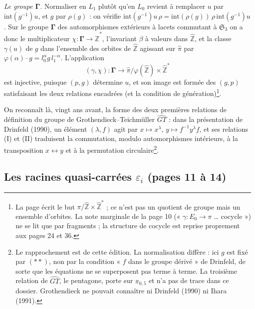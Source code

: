 \documentclass[11pt,a4paper]{article}
\begin{document}
\emph{Le groupe $\boldsymbol{\Gamma}$.} Normaliser en $L_1$ plutôt qu'en $L_0$
revient à remplacer $u$ par $\mathrm{int}(g^{-1})u$, et $g$ par $\rho(g)$ :
on vérifie $\mathrm{int}(g^{-1})u\,\rho = \mathrm{int}(\rho(g))\,\rho\,
\mathrm{int}(g^{-1})u$. Sur le groupe $\boldsymbol{\Gamma}$ des automorphismes
extérieurs à lacets commutant à $\mathfrak{S}_3$ on a donc le multiplicateur
$\chi : \boldsymbol{\Gamma} \to \widehat{\mathbb{Z}}^{*}$, l'invariant $\beta$ à
valeurs dans $\widehat{\mathbb{Z}}$, et la classe $\gamma(u)$ de $g$ dans
l'ensemble des orbites de $\widehat{\mathbb{Z}}$ agissant sur $\widehat{\pi}$
par $\varphi(\alpha)\cdot g = l_0^{\alpha} g\, l_1^{-\alpha}$. L'application
\[
(\gamma, \chi) : \boldsymbol{\Gamma} \longrightarrow
\widehat{\pi}/\varphi(\widehat{\mathbb{Z}}) \times \widehat{\mathbb{Z}}^{*}
\]
est injective, puisque $(p, g)$ détermine $u$, et son image est formée des
$(g, p)$ satisfaisant les deux relations encadrées (et la condition de
génération)\footnote{La page écrit le but $\pi/\hat{\mathbb{Z}} \times
\hat{\mathbb{Z}}^{*}$ ; ce n'est pas un quotient de groupe mais un ensemble
d'orbites. La note marginale de la page 10 (« $\gamma : E_0 \to \pi$ \ldots{}
cocycle ») ne se lit que par fragments ; la structure de cocycle est reprise
proprement aux pages 24 et 36.}.

On reconnaît là, vingt ans avant, la forme des deux premières relations de
définition du groupe de Grothendieck--Teichmüller $\widehat{GT}$ : dans la
présentation de Drinfeld (1990), un élément $(\lambda, f)$ agit par $x \mapsto
x^{\lambda}$, $y \mapsto f^{-1} y^{\lambda} f$, et ses relations (I) et (II)
traduisent la commutation, modulo automorphismes intérieurs, à la transposition
$x \leftrightarrow y$ et à la permutation circulaire\footnote{Le rapprochement
est de cette édition. La normalisation diffère : ici $g$ est fixé par $(**)$,
non par la condition « $f$ dans le groupe dérivé » de Drinfeld, de sorte que
les équations ne se superposent pas terme à terme. La troisième relation de
$\widehat{GT}$, le pentagone, porte sur $\pi_{0,5}$ et n'a pas de trace dans
ce dossier. Grothendieck ne pouvait connaître ni Drinfeld (1990) ni Ihara
(1991).}.

\subsection*{Les racines quasi-carrées $\varepsilon_i$ (pages 11 à 14)}
\end{document}
